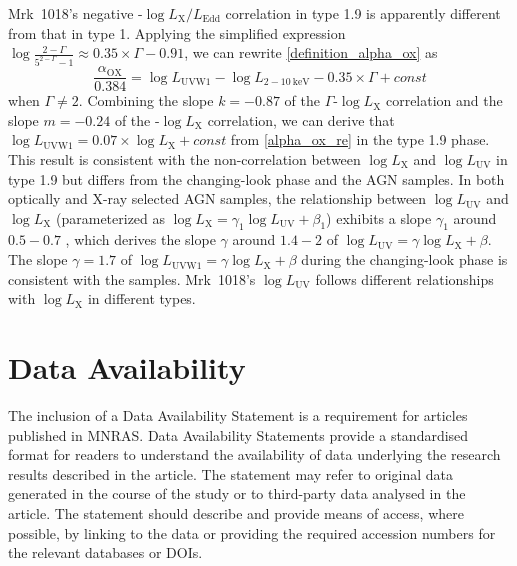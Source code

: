 Mrk~1018's negative \alphaox-$\log{L_\mathrm{X}/L_\mathrm{Edd}}$ correlation in type 1.9 is apparently different from that in type 1. Applying the simplified expression $\log{\frac{2-\Gamma}{5^{2-\Gamma}-1}}\approx 0.35\times \Gamma -0.91$, we can rewrite \autoref{definition_alpha_ox} as
\begin{equation}
\frac{\alpha_\mathrm{OX}}{0.384} = {\log L_\mathrm{UVW1} -\log L_\mathrm{2-10~ keV}-0.35\times\Gamma+const}
\label{alpha_ox_re}
\end{equation} when $\Gamma \neq 2$.
Combining the slope $k=-0.87$ of the $\Gamma$-$\log{L_\mathrm{X}}$ correlation and the slope $m=-0.24$ of the \alphaox-$\log{L_\mathrm{X}}$ correlation, we can derive that $\log L_\mathrm{UVW1} = 0.07\times \log L_\mathrm{X} + const$ from \autoref{alpha_ox_re} in the type 1.9 phase. This result is consistent with the non-correlation between $\log{L_\mathrm{X}}$ and $\log{L_\mathrm{UV}}$ in type 1.9 but differs from the changing-look phase and the AGN samples. In both optically and X-ray selected AGN samples, the relationship between $\log{L_\mathrm{UV}}$ and $\log{L_\mathrm{X}}$ (parameterized as $\log L_\mathrm{X}=  \gamma_1 \log L_\mathrm{UV} +\beta_1$) exhibits a slope $\gamma_1$ around $0.5-0.7$ \citep[e.g.][and references therein]{2017A&A...602A..79L}, which derives the slope $\gamma$ around $1.4-2$ of $\log L_\mathrm{UV}=\gamma \log L_\mathrm{X}+\beta$. The slope $\gamma=1.7$ of $\log L_\mathrm{UVW1}=\gamma \log L_\mathrm{X}+\beta$ during the changing-look phase is consistent with the samples. Mrk~1018's $\log L_\mathrm{UV}$ follows different relationships with $\log L_\mathrm{X}$ in different types.






















\section*{Data Availability}
The inclusion of a Data Availability Statement is a requirement for articles published in MNRAS. Data Availability Statements provide a standardised format for readers to understand the availability of data underlying the research results described in the article. The statement may refer to original data generated in the course of the study or to third-party data analysed in the article. The statement should describe and provide means of access, where possible, by linking to the data or providing the required accession numbers for the relevant databases or DOIs.